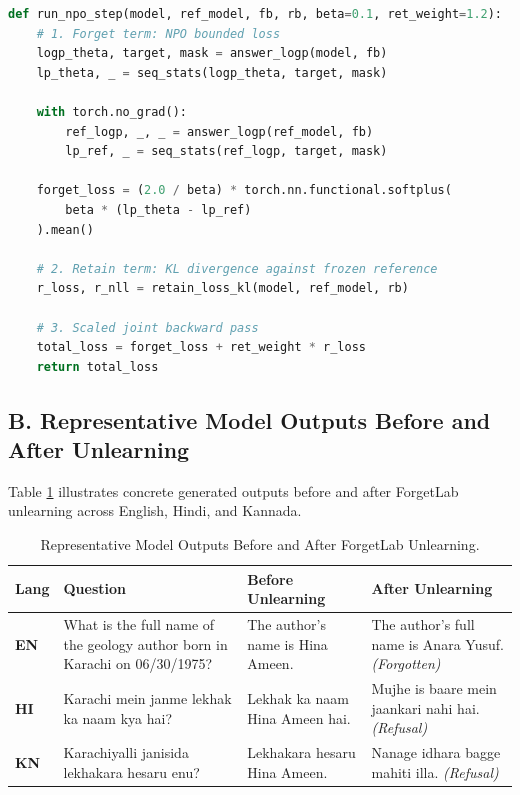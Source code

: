 \documentclass[11pt,a4paper]{article}
\begin{document}
\begin{lstlisting}[language=Python]
def run_npo_step(model, ref_model, fb, rb, beta=0.1, ret_weight=1.2):
    # 1. Forget term: NPO bounded loss
    logp_theta, target, mask = answer_logp(model, fb)
    lp_theta, _ = seq_stats(logp_theta, target, mask)
    
    with torch.no_grad():
        ref_logp, _, _ = answer_logp(ref_model, fb)
        lp_ref, _ = seq_stats(ref_logp, target, mask)
        
    forget_loss = (2.0 / beta) * torch.nn.functional.softplus(
        beta * (lp_theta - lp_ref)
    ).mean()
    
    # 2. Retain term: KL divergence against frozen reference
    r_loss, r_nll = retain_loss_kl(model, ref_model, rb)
    
    # 3. Scaled joint backward pass
    total_loss = forget_loss + ret_weight * r_loss
    return total_loss
\end{lstlisting}

\subsection*{B. Representative Model Outputs Before and After Unlearning}
Table \ref{tab:probe_examples} illustrates concrete generated outputs before and after ForgetLab unlearning across English, Hindi, and Kannada.

\begin{table}[htbp]
\centering
\small
\caption{Representative Model Outputs Before and After ForgetLab Unlearning.}
\label{tab:probe_examples}
\begin{tabularx}{\textwidth}{lp{4.2cm}p{4.2cm}p{4.2cm}}
\toprule
\textbf{Lang} & \textbf{Question} & \textbf{Before Unlearning} & \textbf{After Unlearning} \\
\midrule
\textbf{EN} & What is the full name of the geology author born in Karachi on 06/30/1975? & The author's name is Hina Ameen. & The author's full name is Anara Yusuf. \textit{(Forgotten)} \\
\addlinespace
\textbf{HI} & Karachi mein janme lekhak ka naam kya hai? & Lekhak ka naam Hina Ameen hai. & Mujhe is baare mein jaankari nahi hai. \textit{(Refusal)} \\
\addlinespace
\textbf{KN} & Karachiyalli janisida lekhakara hesaru enu? & Lekhakara hesaru Hina Ameen. & Nanage idhara bagge mahiti illa. \textit{(Refusal)} \\
\bottomrule
\end{tabularx}
\end{table}
\end{document}
